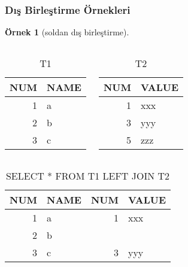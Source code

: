 \documentclass[dvipsnames]{beamer}
\theoremstyle{definition}
\theoremstyle{example}
\newtheorem{ornek}[theorem]{Örnek}
\theoremstyle{plain}
\begin{document}
\begin{frame}[fragile]
  \frametitle{Dış Birleştirme Örnekleri}

  \begin{ornek}[soldan dış birleştirme]
    \begin{columns}[t]
      \begin{tiny}
      \begin{table}
        \caption{T1}
        \begin{tabular}{|r|l|}\hline
NUM & NAME\\\hline\hline
  1 & a   \\\hline
  2 & b   \\\hline
  3 & c   \\\hline
        \end{tabular}
      \end{table}
      \end{tiny}

      \begin{tiny}
      \begin{table}
        \caption{T2}
        \begin{tabular}{|r|l|}\hline
NUM & VALUE\\\hline\hline
  1 & xxx  \\\hline
  3 & yyy  \\\hline
  5 & zzz  \\\hline
        \end{tabular}
      \end{table}
      \end{tiny}
    \end{columns}

    \pause
    \begin{center}
      \begin{tiny}
      \begin{table}
        \caption{SELECT * FROM T1 LEFT JOIN T2}
        \begin{tabular}{|r|l|r|l|}\hline
NUM & NAME & NUM & VALUE\\\hline\hline
  1 & a    &   1 & xxx  \\\hline
  2 & b    &     &      \\\hline
  3 & c    &   3 & yyy  \\\hline
        \end{tabular}
      \end{table}
      \end{tiny}
    \end{center}
  \end{ornek}
\end{frame}
\end{document}
